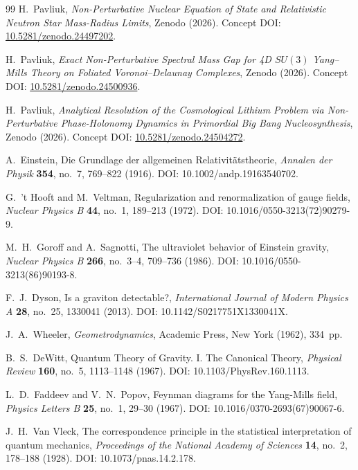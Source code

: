 \documentclass[11pt,a4paper]{article}
\theoremstyle{definition}
\begin{document}
\begin{thebibliography}{99}
H.~Pavliuk, \textit{Non-Perturbative Nuclear Equation of State and Relativistic Neutron Star Mass-Radius Limits}, Zenodo (2026). Concept DOI: \href{https://doi.org/10.5281/zenodo.24497202}{10.5281/zenodo.24497202}.

H.~Pavliuk, \textit{Exact Non-Perturbative Spectral Mass Gap for 4D $SU(3)$ Yang--Mills Theory on Foliated Voronoi--Delaunay Complexes}, Zenodo (2026). Concept DOI: \href{https://doi.org/10.5281/zenodo.24500936}{10.5281/zenodo.24500936}.

H.~Pavliuk, \textit{Analytical Resolution of the Cosmological Lithium Problem via Non-Perturbative Phase-Holonomy Dynamics in Primordial Big Bang Nucleosynthesis}, Zenodo (2026). Concept DOI: \href{https://doi.org/10.5281/zenodo.24504272}{10.5281/zenodo.24504272}.

A.~Einstein, Die Grundlage der allgemeinen Relativit\"atstheorie, \textit{Annalen der Physik} \textbf{354}, no.~7, 769--822 (1916). DOI: 10.1002/andp.19163540702.

G.~'t Hooft and M.~Veltman, Regularization and renormalization of gauge fields, \textit{Nuclear Physics B} \textbf{44}, no.~1, 189--213 (1972). DOI: 10.1016/0550-3213(72)90279-9.

M.~H.~Goroff and A.~Sagnotti, The ultraviolet behavior of Einstein gravity, \textit{Nuclear Physics B} \textbf{266}, no.~3--4, 709--736 (1986). DOI: 10.1016/0550-3213(86)90193-8.

F.~J.~Dyson, Is a graviton detectable?, \textit{International Journal of Modern Physics A} \textbf{28}, no.~25, 1330041 (2013). DOI: 10.1142/S0217751X1330041X.

J.~A.~Wheeler, \textit{Geometrodynamics}, Academic Press, New York (1962), 334~pp.

B.~S.~DeWitt, Quantum Theory of Gravity. I. The Canonical Theory, \textit{Physical Review} \textbf{160}, no.~5, 1113--1148 (1967). DOI: 10.1103/PhysRev.160.1113.

L.~D.~Faddeev and V.~N.~Popov, Feynman diagrams for the Yang-Mills field, \textit{Physics Letters B} \textbf{25}, no.~1, 29--30 (1967). DOI: 10.1016/0370-2693(67)90067-6.

J.~H.~Van Vleck, The correspondence principle in the statistical interpretation of quantum mechanics, \textit{Proceedings of the National Academy of Sciences} \textbf{14}, no.~2, 178--188 (1928). DOI: 10.1073/pnas.14.2.178.


\end{thebibliography}
\end{document}
